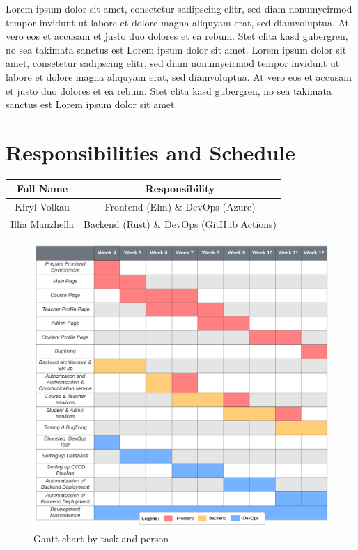 \documentclass[a4paper,11pt,twoside]{report}
\theoremstyle{definition}
\begin{document}
Lorem ipsum dolor sit amet, consetetur sadipscing elitr, sed diam nonumyeirmod tempor invidunt ut labore et dolore magna aliquyam erat, sed diamvoluptua. At vero eos et accusam et justo duo dolores et ea rebum. Stet clita kasd gubergren, no sea takimata sanctus est Lorem ipsum dolor sit amet. Lorem ipsum dolor sit amet, consetetur sadipscing elitr, sed diam nonumyeirmod tempor invidunt ut labore et dolore magna aliquyam erat, sed diamvoluptua. At vero eos et accusam et justo duo dolores et ea rebum. Stet clita kasd gubergren, no sea takimata sanctus est Lorem ipsum dolor sit amet.

\chapter*{Responsibilities and Schedule}
\begin{center}
\begin{tabular}{ |c|c| } 
 \hline
 Full Name & Responsibility \\ 
 \hline
 Kiryl Volkau & Frontend (Elm) \& DevOps (Azure) \\ 
 Illia Manzhella & Backend (Rust) \& DevOps (GitHub Actions) \\ 
 \hline
\end{tabular}
\begin{figure}[h]
    \includegraphics[scale=.52]{img/gantt.png}
    \caption{Gantt chart by task and person}
\end{figure}
\end{center}
\end{document}
